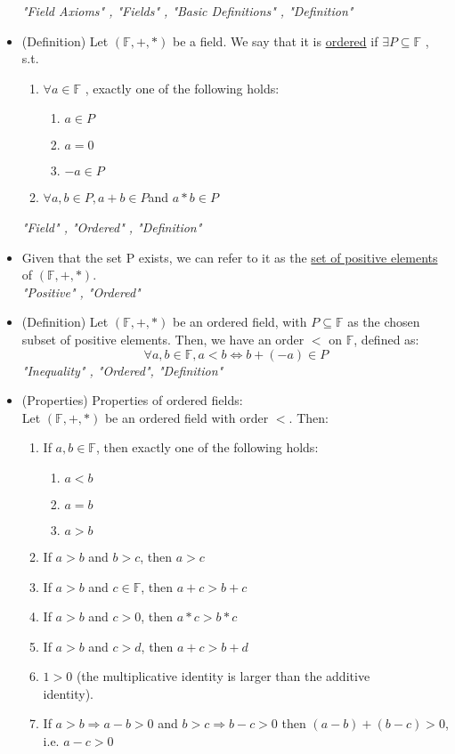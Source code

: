\documentclass{article}
\begin{document}
\begin{itemize}
    \textit{"Field Axioms" , "Fields" , "Basic Definitions" , "Definition"}    
    
    \item (Definition) Let $(\mathbb{F},+,*)$ be a field. We say that it is \underline{ordered} if $\exists P \subseteq \mathbb{F}$ , s.t. 
    \begin{enumerate}
        \item $\forall a \in \mathbb{F}$ , exactly one of the following holds: 
        \begin{enumerate}
            \item $a \in P$
            \item $a=0$
            \item $-a \in P$
        \end{enumerate}
        \item $\forall a,b \in P, a+b \in P $and $a*b \in P$
    \end{enumerate}
    \textit{"Field" , "Ordered" , "Definition"}
    
    \item Given that the set P exists, we can refer to it as the \underline{set of positive elements} of $(\mathbb{F},+,*)$.\\
    \vspace{0.25cm} \textit{"Positive" , "Ordered"}
    
    \item (Definition) Let $(\mathbb{F},+,*)$ be an ordered field, with $P \subseteq \mathbb{F}$ as the chosen subset of positive elements. Then, we have an order $<$ on $\mathbb{F}$, defined as:
    $$\forall a,b \in \mathbb{F}, a < b \Leftrightarrow b+(-a) \in P$$
    \textit{"Inequality" , "Ordered", "Definition"}
    
    \item (Properties) Properties of ordered fields: \\
    Let $(\mathbb{F} , + , *)$ be an ordered field with order $<$. Then:
    \begin{enumerate}
        \item If $a,b \in \mathbb{F}$, then exactly one of the following holds:
        \begin{enumerate}
            \item $a<b$
            \item $a=b$
            \item $a>b$
        \end{enumerate}
        \item If $a>b$ and $b>c$, then $a>c$
        \item If $a>b$ and $c \in \mathbb{F}$, then $a+c > b+c$
        \item If $a>b$ and $c>0$, then $a*c > b*c$
        \item If $a>b$ and $c>d$, then $a+c > b+d$
        \item $1>0$ (the multiplicative identity is larger than the additive \\ identity).
        \item If $a>b \Rightarrow a-b > 0$ and $b>c \Rightarrow b-c>0$ then $(a-b) + (b-c)>0$, i.e. $a-c>0$
        

\end{enumerate}
\end{itemize}
\end{document}
